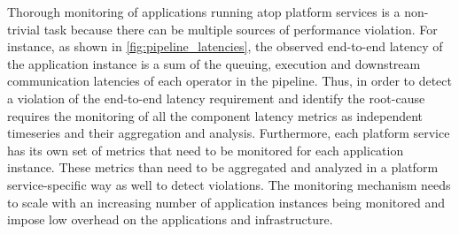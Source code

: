 \par Thorough monitoring of applications running atop platform services is a non-trivial task because there can be multiple sources of performance violation. For instance, as shown in \cref{fig:pipeline_latencies}, the observed end-to-end latency of the application instance is a sum of the queuing, execution and downstream communication latencies of each operator in the pipeline.  Thus, in order to detect a violation of the end-to-end latency requirement and identify the root-cause requires the monitoring of all the component latency metrics as independent timeseries and their aggregation and analysis. Furthermore, each platform service has its own set of metrics that need to be monitored for each application instance. These metrics than need to be aggregated and analyzed in a platform service-specific way as well to detect violations. The monitoring mechanism needs to scale with an increasing number of application instances being monitored and impose low overhead on the applications and infrastructure.

